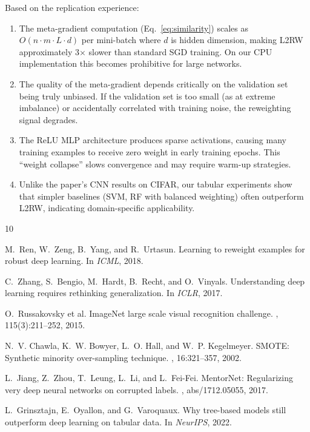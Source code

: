 \documentclass{article}
\begin{document}
Based on the replication experience:

\begin{enumerate}
  \item The meta-gradient computation (Eq.~\ref{eq:similarity}) scales as
    $O(n \cdot m \cdot L \cdot d)$ per mini-batch where $d$ is hidden dimension,
    making L2RW approximately 3$\times$ slower than standard SGD training.
    On our CPU implementation this becomes prohibitive for large networks.

  \item The quality of the meta-gradient depends critically on the validation set
    being truly unbiased. If the validation set is too small (as at extreme
    imbalance) or accidentally correlated with training noise, the reweighting
    signal degrades.

  \item The ReLU MLP architecture produces sparse activations, causing many
    training examples to receive zero weight in early training epochs.
    This ``weight collapse'' slows convergence and may require warm-up strategies.

  \item Unlike the paper's CNN results on CIFAR, our tabular experiments show
    that simpler baselines (SVM, RF with balanced weighting) often outperform
    L2RW, indicating domain-specific applicability.
\end{enumerate}




\begin{thebibliography}{10}

M.~Ren, W.~Zeng, B.~Yang, and R.~Urtasun.
\newblock Learning to reweight examples for robust deep learning.
\newblock In {\em ICML}, 2018.

C.~Zhang, S.~Bengio, M.~Hardt, B.~Recht, and O.~Vinyals.
\newblock Understanding deep learning requires rethinking generalization.
\newblock In {\em ICLR}, 2017.

O.~Russakovsky et al.
\newblock ImageNet large scale visual recognition challenge.
, 115(3):211--252, 2015.

N.~V. Chawla, K.~W. Bowyer, L.~O. Hall, and W.~P. Kegelmeyer.
\newblock SMOTE: Synthetic minority over-sampling technique.
, 16:321--357, 2002.

L.~Jiang, Z.~Zhou, T.~Leung, L.~Li, and L.~Fei-Fei.
\newblock MentorNet: Regularizing very deep neural networks on corrupted labels.
, abs/1712.05055, 2017.

L.~Grinsztajn, E.~Oyallon, and G.~Varoquaux.
\newblock Why tree-based models still outperform deep learning on tabular data.
\newblock In {\em NeurIPS}, 2022.

\end{thebibliography}
\end{document}
